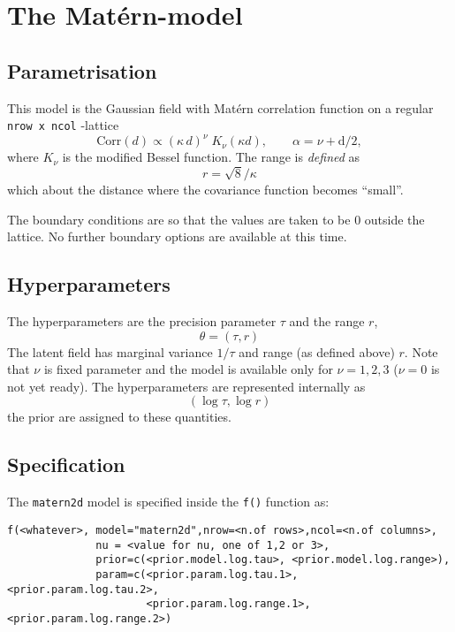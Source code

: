 \documentclass[a4paper,11pt]{article}
\begin{document}



\section*{The Mat\'ern-model}
\subsection*{Parametrisation}

This model is the Gaussian field with Mat\'ern correlation function on
a regular \verb|nrow x ncol| -lattice
\begin{displaymath}
    \text{Corr}(d)
    \propto
    \left(\kappa\, {d}\right)^{\nu}
    \;
    K_{\nu}( \kappa d), \qquad \alpha = \nu + \text{d}/2,
\end{displaymath}
where $K_{\nu}$ is the modified Bessel function. The range is
\emph{defined} as
\begin{displaymath}
    r = {\sqrt{8}}/{\kappa}
\end{displaymath}
which about the distance where the covariance function becomes
``small''.

The boundary conditions are so that the values are taken to be $0$
outside the lattice. No further boundary options are available at this
time.

\subsection*{Hyperparameters}

The hyperparameters are the precision parameter $\tau$ and the range
$r$,
\begin{displaymath}
    \theta = (\tau, r)
\end{displaymath}
The latent field has marginal variance $1/\tau$ and range (as defined
above) $r$. Note that $\nu$ is fixed parameter and the model is
available only for $\nu=1,2,3$ ($\nu=0$ is not yet ready).  The
hyperparameters are represented internally as
\begin{displaymath}
    (\log\tau, \log r)
\end{displaymath}
the prior are assigned to these quantities.

\subsection*{Specification}

The {\tt matern2d} model is specified inside the {\tt f()} function as:
\begin{verbatim}
f(<whatever>, model="matern2d",nrow=<n.of rows>,ncol=<n.of columns>,
              nu = <value for nu, one of 1,2 or 3>,          
              prior=c(<prior.model.log.tau>, <prior.model.log.range>),
              param=c(<prior.param.log.tau.1>, <prior.param.log.tau.2>, 
                      <prior.param.log.range.1>, <prior.param.log.range.2>)
\end{verbatim}
\end{document}
